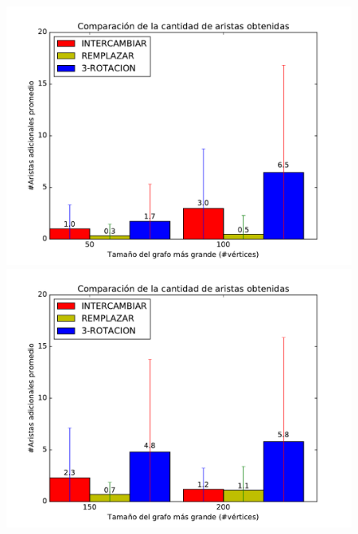\begin{figure}[H]
\centering
\begin{minipage}{0.49\textwidth}
  \centering
    \includegraphics[width=1\textwidth]{graficos/problema_5/calidad0.pdf}
  \caption{}
  \label{fig:calidad1}
\end{minipage}%
\hspace{0.01\textwidth}
\begin{minipage}{0.49\textwidth}   
  \centering
    \includegraphics[width=1\textwidth]{graficos/problema_5/calidad2.pdf} 
  \caption{}
  \label{fig:calidad2}
\end{minipage}


\end{figure}
